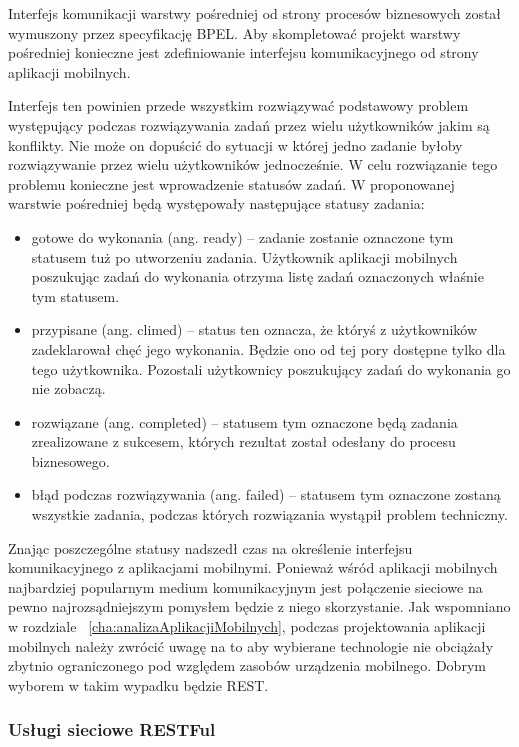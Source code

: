 Interfejs komunikacji warstwy pośredniej od strony procesów biznesowych został wymuszony przez specyfikację BPEL. Aby skompletować projekt warstwy pośredniej konieczne jest zdefiniowanie interfejsu komunikacyjnego od strony aplikacji mobilnych. 

Interfejs ten powinien przede wszystkim rozwiązywać podstawowy problem występujący podczas rozwiązywania zadań przez wielu użytkowników jakim są konflikty. Nie może on dopuścić do sytuacji w której jedno zadanie byłoby rozwiązywanie przez wielu użytkowników jednocześnie. W celu rozwiązanie tego problemu konieczne jest wprowadzenie statusów zadań. W proponowanej warstwie pośredniej będą występowały następujące statusy zadania:

\begin{itemize}
\item gotowe do wykonania (ang. ready) -- zadanie zostanie oznaczone tym statusem tuż po utworzeniu zadania. Użytkownik aplikacji mobilnych poszukując zadań do wykonania otrzyma listę zadań oznaczonych właśnie tym statusem. 
\item przypisane (ang. climed) -- status ten oznacza, że któryś z użytkowników zadeklarował chęć jego wykonania. Będzie ono od tej pory dostępne tylko dla tego użytkownika. Pozostali użytkownicy poszukujący zadań do wykonania go nie zobaczą. 
\item rozwiązane (ang. completed) -- statusem tym oznaczone będą zadania zrealizowane z sukcesem, których rezultat został odesłany do procesu biznesowego. 
\item błąd podczas rozwiązywania (ang. failed) -- statusem tym oznaczone zostaną wszystkie zadania, podczas których rozwiązania wystąpił problem techniczny. 
\end{itemize}

Znając poszczególne statusy nadszedł czas na określenie interfejsu komunikacyjnego z aplikacjami mobilnymi. Ponieważ wśród aplikacji mobilnych najbardziej popularnym medium komunikacyjnym jest połączenie sieciowe na pewno najrozsądniejszym pomysłem będzie z niego skorzystanie. Jak wspomniano w rozdziale ~\ref{cha:analizaAplikacjiMobilnych}, podczas projektowania aplikacji mobilnych należy zwrócić uwagę na to aby wybierane technologie nie obciążały zbytnio ograniczonego pod względem zasobów urządzenia mobilnego. Dobrym wyborem w takim wypadku będzie REST. 

\subsubsection{Usługi sieciowe RESTFul}

